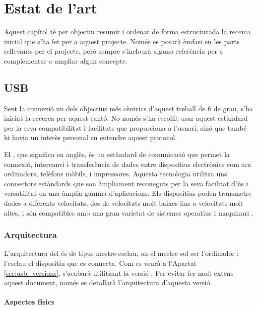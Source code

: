 \chapter{Estat de l'art}
\label{cap:estat-de-l-art}

Aquest capítol té per objectiu resumir i ordenar de forma estructurada la
recerca inicial que s'ha fet per a aquest projecte. Només es posarà èmfasi en
les parts rellevants per el projecte, però sempre s'inclourà alguna referència
per a complementar o ampliar algun concepte.

\section{USB}

Sent la connexió  un dels objectius més cèntrics d'aquest treball de
fi de grau, s'ha iniciat la recerca per aquest cantó. No només s'ha escollit
usar aquest estàndard per la seva compatibilitat
i facilitats que proporciona a l'usuari, sinó que també hi havia un interès
personal en entendre aquest protocol.

El , que significa  en anglès, és un
estàndard de comunicació que permet la connexió, intercanvi i transferència de
dades entre dispositius electrònics com ara ordinadors, telèfons mòbils, i
impressores. Aquesta tecnologia utilitza uns connectors estàndards que son
àmpliament reconeguts per la seva facilitat d'ús i versatilitat en una àmplia
gamma d'aplicacions. Els dispositius  poden transmetre dades a
diferents velocitats, des de velocitats molt baixes fins a velocitats molt
altes, i són compatibles amb una gran varietat de sistemes operatius i
maquinari \cite{Axelson2015USB}.

\subsection{Arquitectura}

L'arquitectura del  és de tipus mestre-esclau, on el mestre sol ser
l'ordinador i l'esclau el dispositiu que es connecta. Com es veurà a l'Apartat
\ref{sec:usb_versions}, s'acabarà utilitzant la versió . Per
evitar fer molt extens aquest document, només es detallarà l'arquitectura
d'aquesta versió.

\subsubsection*{Aspectes físics}
\label{subsub:usb_physic}

